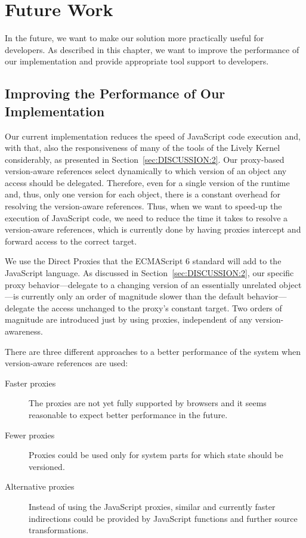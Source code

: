 \chapter{Future Work} \label{chapter:FUTURE_WORK}

In the future, we want to make our solution more practically useful for developers.
As described in this chapter, we want to improve the performance of our implementation and provide appropriate tool support to developers.



\section{Improving the Performance of Our Implementation} \label{sec:FUTURE_WORK:1}

Our current implementation reduces the speed of JavaScript code execution and, with that, also the responsiveness of many of the tools of the Lively Kernel considerably, as presented in Section~\ref{sec:DISCUSSION:2}.
Our proxy-based version-aware references select dynamically to which version of an object any access should be delegated.
Therefore, even for a single version of the runtime and, thus, only one version for each object, there is a constant overhead for resolving the version-aware references.
Thus, when we want to speed-up the execution of JavaScript code, we need to reduce the time it takes to resolve a version-aware references, which is currently done by having proxies intercept and forward access to the correct target.

We use the Direct Proxies that the ECMAScript 6 standard will add to the JavaScript language.
As discussed in Section~\ref{sec:DISCUSSION:2}, our specific proxy behavior---delegate to a changing version of an essentially unrelated object---is currently only an order of magnitude slower than the default behavior---delegate the access unchanged to the proxy's constant target.
Two orders of magnitude are introduced just by using proxies, independent of any version-awareness.

There are three different approaches to a better performance of the system when version-aware references are used:

\begin{description}
    \item[Faster proxies] The proxies are not yet fully supported by browsers and it seems reasonable to expect better performance in the future.
    \item[Fewer proxies] Proxies could be used only for system parts for which state should be versioned.
    \item[Alternative proxies] Instead of using the JavaScript proxies, similar and currently faster indirections could be provided by JavaScript functions and further source transformations.
\end{description}

